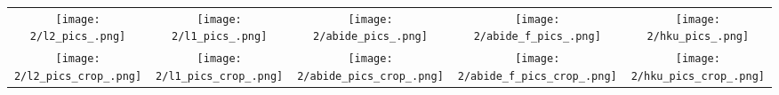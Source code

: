 \begin{tabular}{c @{\hskip 0pt} c @{\hskip 0pt} c @{\hskip 0pt} c @{\hskip 0pt} c}
    \texttt{[image: 2/l2\_pics\_.png]}&
    \texttt{[image: 2/l1\_pics\_.png]}&
    \texttt{[image: 2/abide\_pics\_.png]}&
    \texttt{[image: 2/abide\_f\_pics\_.png]}&
    \texttt{[image: 2/hku\_pics\_.png]}\\
    \texttt{[image: 2/l2\_pics\_crop\_.png]}&
    \texttt{[image: 2/l1\_pics\_crop\_.png]}&
    \texttt{[image: 2/abide\_pics\_crop\_.png]}&
    \texttt{[image: 2/abide\_f\_pics\_crop\_.png]}&
    \texttt{[image: 2/hku\_pics\_crop\_.png]}
\end{tabular}